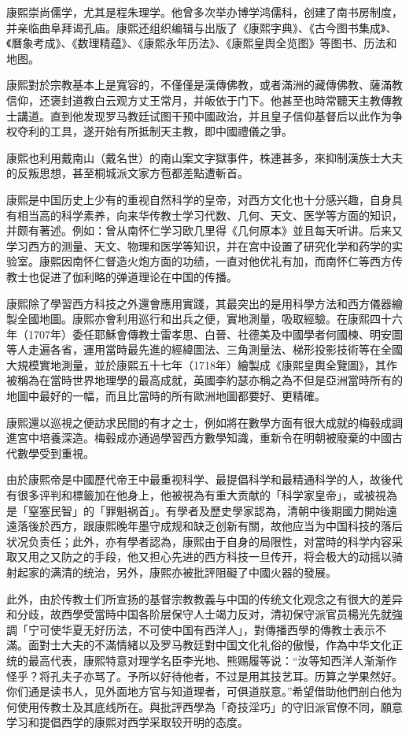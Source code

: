 康熙崇尚儒学，尤其是程朱理学。他曾多次举办博学鸿儒科，创建了南书房制度，并亲临曲阜拜谒孔庙。康熙还组织编辑与出版了《康熙字典》、《古今图书集成》、《曆象考成》、《数理精蕴》、《康熙永年历法》、《康熙皇舆全览图》等图书、历法和地图。

康熙對於宗教基本上是寬容的，不僅僅是漢傳佛教，或者滿洲的藏傳佛教、薩滿教信仰，还褒封道教白云观方丈王常月，并皈依于门下。他甚至也時常聽天主教傳教士講道。直到他发现罗马教廷试图干预中國政治，并且皇子信仰基督后以此作为争权夺利的工具，遂开始有所抵制天主教，即中國禮儀之爭。

康熙也利用戴南山（戴名世）的南山案文字獄事件，株連甚多，來抑制漢族士大夫的反叛思想，甚至桐城派文家方苞都差點遭斬首。

康熙是中国历史上少有的重视自然科学的皇帝，对西方文化也十分感兴趣，自身具有相当高的科学素养，向来华传教士学习代数、几何、天文、医学等方面的知识，并颇有著述。例如：曾从南怀仁学习欧几里得《几何原本》並且每天听讲。后来又学习西方的测量、天文、物理和医学等知识，并在宫中设置了研究化学和药学的实验室。康熙因南怀仁督造火炮方面的功绩，一直对他优礼有加，而南怀仁等西方传教士也促进了伽利略的弹道理论在中国的传播。

康熙除了學習西方科技之外還會應用實踐，其最突出的是用科學方法和西方儀器繪製全國地圖。康熙亦會利用巡行和出兵之便，實地測量，吸取經驗。在康熙四十六年（1707年）委任耶穌會傳教士雷孝思、白晉、社德美及中國學者何國楝、明安圖等人走遍各省，運用當時最先進的經緯圖法、三角測量法、梯形投影技術等在全國大規模實地測量，並於康熙五十七年（1718年）繪製成《康熙皇輿全覽圖》，其作被稱為在當時世界地理學的最高成就，英國李約瑟亦稱之為不但是亞洲當時所有的地圖中最好的一幅，而且比當時的所有歐洲地圖都要好、更精確。

康熙還以巡視之便訪求民間的有才之士，例如將在數學方面有很大成就的梅毂成調進宮中培養深造。梅毂成亦通過學習西方數學知識，重新令在明朝被廢棄的中國古代數學受到重視。

由於康熙帝是中國歷代帝王中最重视科学、最提倡科学和最精通科学的人，故後代有很多评判和標籤加在他身上，他被視為有重大贡献的「科学家皇帝」，或被視為是「窒塞民智」的「罪魁祸首」。有學者及歷史學家認為，清朝中後期國力開始遠遠落後於西方，跟康熙晚年墨守成规和缺乏创新有關，故他应当为中国科技的落后状况负责任；此外，亦有學者認為，康熙由于自身的局限性，对當時的科学内容采取又用之又防之的手段，他又担心先进的西方科技一旦传开，将会极大的动摇以骑射起家的满清的统治，另外，康熙亦被批評阻礙了中國火器的發展。

此外，由於传教士们所宣扬的基督宗教教義与中国的传统文化观念之有很大的差异和分歧，故西學受當時中国各阶层保守人士竭力反对，清初保守派官员楊光先就強調「宁可使华夏无好历法，不可使中国有西洋人」，對傳播西學的傳教士表示不滿。面對士大夫的不滿情緒以及罗马教廷對中国文化礼俗的傲慢，作為中华文化正统的最高代表，康熙特意对理学名臣李光地、熊赐履等说：“汝等知西洋人渐渐作怪乎？将孔夫子亦骂了。予所以好待他者，不过是用其技艺耳。历算之学果然好。你们通是读书人，见外面地方官与知道理者，可俱道朕意。”希望借助他們剖白他为何使用传教士及其底线所在。與批評西學為「奇技淫巧」的守旧派官僚不同，願意学习和提倡西学的康熙对西学采取较开明的态度。

